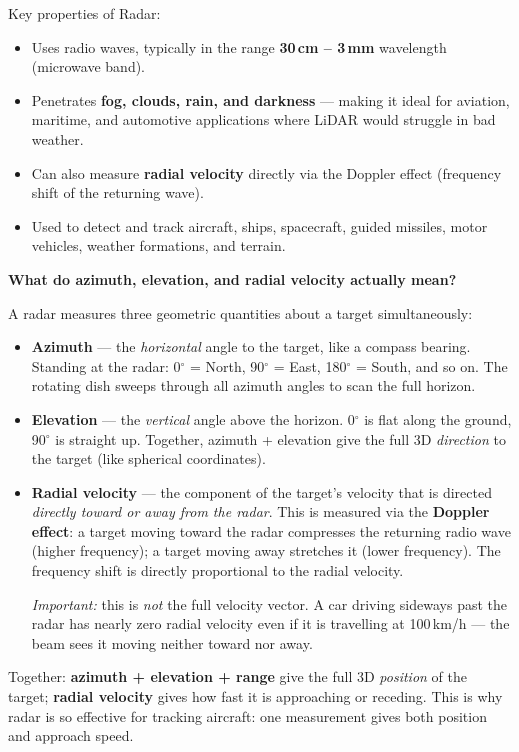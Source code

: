 \documentclass[12pt, a4paper]{article}
\begin{document}
Key properties of Radar:
\begin{itemize}[leftmargin=1.4em]
  \item Uses radio waves, typically in the range \textbf{30\,cm -- 3\,mm}
    wavelength (microwave band).
  \item Penetrates \textbf{fog, clouds, rain, and darkness} --- making it ideal
    for aviation, maritime, and automotive applications where LiDAR would
    struggle in bad weather.
  \item Can also measure \textbf{radial velocity} directly via the Doppler
    effect (frequency shift of the returning wave).
  \item Used to detect and track aircraft, ships, spacecraft, guided missiles,
    motor vehicles, weather formations, and terrain.
\end{itemize}

\begin{notebox}
  \textbf{What do azimuth, elevation, and radial velocity actually mean?}

  A radar measures three geometric quantities about a target simultaneously:

  \begin{itemize}[leftmargin=1.2em,itemsep=3pt]
    \item \textbf{Azimuth} --- the \emph{horizontal} angle to the target,
      like a compass bearing.  Standing at the radar: 0$^\circ$ = North, 90$^\circ$ = East,
      180$^\circ$ = South, and so on.  The rotating dish sweeps through all azimuth
      angles to scan the full horizon.

    \item \textbf{Elevation} --- the \emph{vertical} angle above the horizon.
      0$^\circ$ is flat along the ground, 90$^\circ$ is straight up.  Together, azimuth +
      elevation give the full 3D \emph{direction} to the target (like
      spherical coordinates).

    \item \textbf{Radial velocity} --- the component of the target's velocity
      that is directed \emph{directly toward or away from the radar}.  This is
      measured via the \textbf{Doppler effect}: a target moving toward the
      radar compresses the returning radio wave (higher frequency); a target
      moving away stretches it (lower frequency).  The frequency shift is
      directly proportional to the radial velocity.

      \textit{Important:} this is \emph{not} the full velocity vector.  A car
      driving sideways past the radar has nearly zero radial velocity even if
      it is travelling at 100\,km/h --- the beam sees it moving neither toward
      nor away.
  \end{itemize}

  Together: \textbf{azimuth + elevation + range} give the full 3D
  \emph{position} of the target; \textbf{radial velocity} gives how fast it
  is approaching or receding.  This is why radar is so effective for tracking
  aircraft: one measurement gives both position and approach speed.
\end{notebox}
\end{document}
